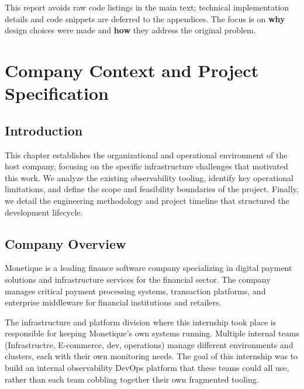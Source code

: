 \documentclass[12pt,a4paper]{report}
\begin{document}
This report avoids raw code listings in the main text; technical implementation details and code snippets are deferred to the appendices. The focus is on \textbf{why} design choices were made and \textbf{how} they address the original problem.

\newpage



\chapter{Company Context and Project Specification}

\section*{Introduction}
This chapter establishes the organizational and operational environment of the host company, focusing on the specific infrastructure challenges that motivated this work. We analyze the existing observability tooling, identify key operational limitations, and define the scope and feasibility boundaries of the project. Finally, we detail the engineering methodology and project timeline that structured the development lifecycle.

\section{Company Overview}

Monetique is a leading finance software company specializing in digital payment solutions and infrastructure services for the financial sector. The company manages critical payment processing systems, transaction platforms, and enterprise middleware for financial institutions and retailers.

The infrastructure and platform division where this internship took place is responsible for keeping Monetique's own systems running. Multiple internal teams (Infrastructre, E-commerce, dev, operations) manage different environments and clusters, each with their own monitoring needs. The goal of this internship was to build an internal observability DevOps platform that these teams could all use, rather than each team cobbling together their own fragmented tooling.
\end{document}
